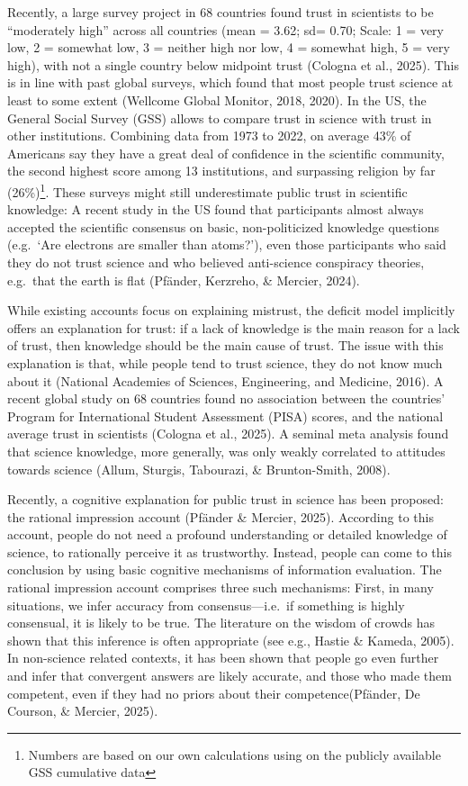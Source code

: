 \documentclass[
  english,
  doc,floatsintext]{apa6}
\begin{document}
Recently, a large survey project in 68 countries found trust in scientists to be ``moderately high'' across all countries (mean = 3.62; sd= 0.70; Scale: 1 = very low, 2 = somewhat low, 3 = neither high nor low, 4 = somewhat high, 5 = very high), with not a single country below midpoint trust (Cologna et al., 2025). This is in line with past global surveys, which found that most people trust science at least to some extent (Wellcome Global Monitor, 2018, 2020). In the US, the General Social Survey (GSS) allows to compare trust in science with trust in other institutions. Combining data from 1973 to 2022, on average 43\% of Americans say they have a great deal of confidence in the scientific community, the second highest score among 13 institutions, and surpassing religion by far (26\%)\footnote{Numbers are based on our own calculations using on the publicly available GSS cumulative data}. These surveys might still underestimate public trust in scientific knowledge: A recent study in the US found that participants almost always accepted the scientific consensus on basic, non-politicized knowledge questions (e.g.~`Are electrons are smaller than atoms?'), even those participants who said they do not trust science and who believed anti-science conspiracy theories, e.g.~that the earth is flat (Pfänder, Kerzreho, \& Mercier, 2024).

While existing accounts focus on explaining mistrust, the deficit model implicitly offers an explanation for trust: if a lack of knowledge is the main reason for a lack of trust, then knowledge should be the main cause of trust. The issue with this explanation is that, while people tend to trust science, they do not know much about it (National Academies of Sciences, Engineering, and Medicine, 2016). A recent global study on 68 countries found no association between the countries' Program for International Student Assessment (PISA) scores, and the national average trust in scientists (Cologna et al., 2025). A seminal meta analysis found that science knowledge, more generally, was only weakly correlated to attitudes towards science (Allum, Sturgis, Tabourazi, \& Brunton-Smith, 2008).

Recently, a cognitive explanation for public trust in science has been proposed: the rational impression account (Pfänder \& Mercier, 2025). According to this account, people do not need a profound understanding or detailed knowledge of science, to rationally perceive it as trustworthy. Instead, people can come to this conclusion by using basic cognitive mechanisms of information evaluation. The rational impression account comprises three such mechanisms: First, in many situations, we infer accuracy from consensus---i.e.~if something is highly consensual, it is likely to be true. The literature on the wisdom of crowds has shown that this inference is often appropriate (see e.g., Hastie \& Kameda, 2005). In non-science related contexts, it has been shown that people go even further and infer that convergent answers are likely accurate, and those who made them competent, even if they had no priors about their competence(Pfänder, De Courson, \& Mercier, 2025).
\end{document}
